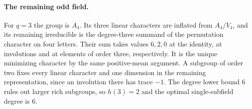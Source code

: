 \paragraph{The remaining odd field.}
For $q=3$ the group is $A_4$. Its three linear characters are inflated from $A_4/V_4$, and its remaining irreducible is the degree-three summand of the permutation character on four letters. Their sum takes values $6,2,0$ at the identity, at involutions and at elements of order three, respectively. It is the unique minimizing character by the same positive-mean argument. A subgroup of order two fixes every linear character and one dimension in the remaining representation, since an involution there has trace $-1$. The degree lower bound $6$ rules out larger rich subgroups, so $h(3)=2$ and the optimal single-subfield degree is $6$.
